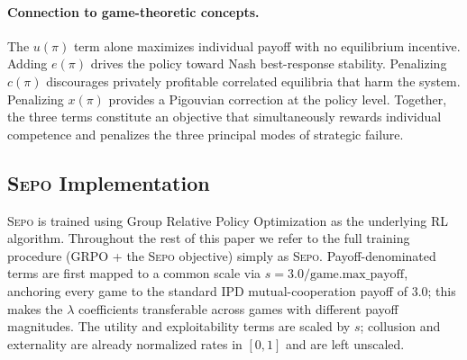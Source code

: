 \documentclass[letterpaper]{article} %
\newcommand{\sepo}{\textsc{Sepo}}
\begin{document}
\paragraph{Connection to game-theoretic concepts.} The $u(\pi)$ term alone maximizes individual payoff with no equilibrium incentive. Adding $e(\pi)$ drives the policy toward Nash best-response stability. Penalizing $c(\pi)$ discourages privately profitable correlated equilibria that harm the system. Penalizing $x(\pi)$ provides a Pigouvian correction at the policy level. Together, the three terms constitute an objective that simultaneously rewards individual competence and penalizes the three principal modes of strategic failure.
\subsection{\sepo{} Implementation}
\label{sec:grpo}
\sepo{} is trained using Group Relative Policy Optimization \citep[GRPO;][]{shao2024deepseekmath} as the underlying RL algorithm. Throughout the rest of this paper we refer to the full training procedure (GRPO + the \sepo{} objective) simply as \sepo{}. Payoff-denominated terms are first mapped to a common scale via $s = 3.0/\text{game.max\_payoff}$, anchoring every game to the standard IPD mutual-cooperation payoff of 3.0; this makes the $\lambda$ coefficients transferable across games with different payoff magnitudes. The utility and exploitability terms are scaled by $s$; collusion and externality are already normalized rates in $[0,1]$ and are left unscaled.
\end{document}
